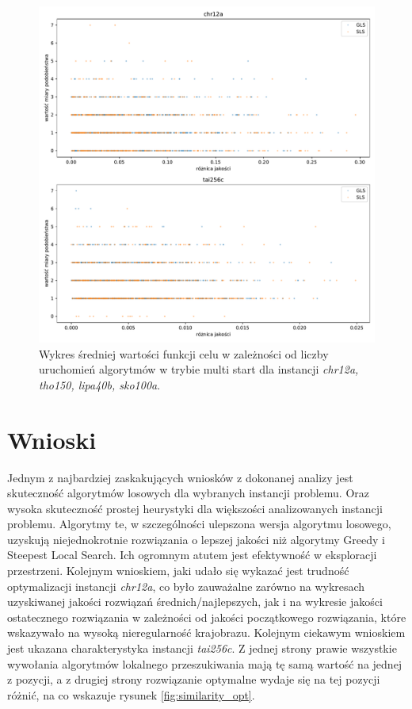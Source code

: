 \documentclass{article}
\begin{document}
\begin{figure}[H]
	\centering
	\includegraphics[width=\linewidth]{figs/delta_quality_interior_vs_similarity.pdf}
	\caption{Wykres średniej wartości funkcji celu w zależności od liczby uruchomień algorytmów w trybie multi start dla instancji \textit{chr12a, tho150, lipa40b, sko100a}.}
	\label{fig:similarity_interior}
\end{figure}

\section{Wnioski}
Jednym z najbardziej zaskakujących wniosków z dokonanej analizy jest skuteczność algorytmów losowych dla wybranych instancji problemu. Oraz wysoka skuteczność prostej heurystyki dla większości analizowanych instancji problemu. Algorytmy te, w szczególności ulepszona wersja algorytmu losowego, uzyskują niejednokrotnie rozwiązania o lepszej jakości niż algorytmy Greedy i Steepest Local Search. Ich ogromnym atutem jest efektywność w eksploracji przestrzeni. Kolejnym wnioskiem, jaki udało się wykazać jest trudność optymalizacji instancji \textit{chr12a}, co było zauważalne zarówno na wykresach uzyskiwanej jakości rozwiązań średnich/najlepszych, jak i na wykresie jakości ostatecznego rozwiązania w zależności od jakości początkowego rozwiązania, które wskazywało na wysoką nieregularność krajobrazu. Kolejnym ciekawym wnioskiem jest ukazana charakterystyka instancji \textit{tai256c}. Z jednej strony prawie wszystkie wywołania algorytmów lokalnego przeszukiwania mają tę samą wartość na jednej z pozycji, a z drugiej strony rozwiązanie optymalne wydaje się na tej pozycji różnić, na co wskazuje rysunek \ref{fig:similarity_opt}.
\par 
\end{document}
